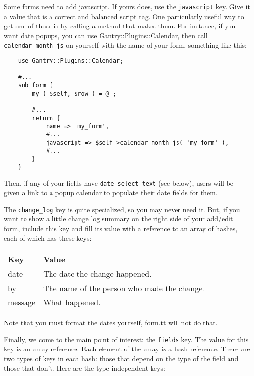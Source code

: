 Some forms need to add javascript.  If yours does, use the \verb+javascript+
key.  Give it a value that is a correct and balanced script tag.  One
particularly useful way to get one of those is by calling a method that
makes them.  For instance, if you want date popups, you can use
Gantry::Plugins::Calendar, then call \verb+calendar_month_js+ on yourself
with the name of your form, something like this:

\begin{verbatim}
    use Gantry::Plugins::Calendar;

    #...
    sub form {
        my ( $self, $row ) = @_;

        #...
        return {
            name => 'my_form',
            #...
            javascript => $self->calendar_month_js( 'my_form' ),
            #...
        }
    }
\end{verbatim}

Then, if any of your fields have \verb+date_select_text+ (see below), users
will be given a link to a popup calendar to populate their date fields for
them.

The \verb+change_log+ key is quite specialized, so you may never need it.
But, if you want to show a little change log summary on the right side of
your add/edit form, include this key and fill its value with a reference
to an array of hashes, each of which has these keys:

\begin{tabular}{l|l}
Key                & Value \\
\hline
date               & The date the change happened.               \\
by                 & The name of the person who made the change. \\
message            & What happened.                              \\
\end{tabular}

Note that you must format the dates yourself, form.tt will not do that.

Finally, we come to the main point of interest: the \verb+fields+ key.
The value for this key is an array reference.  Each element of the array
is a hash reference.  There are two types of keys in each hash: those
that depend on the type of the field and those that don't.  Here are the
type independent keys:

